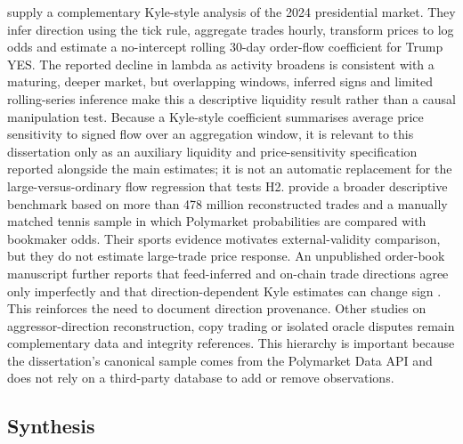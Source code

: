 \citet{tsangyang2026anatomy} supply a complementary Kyle-style analysis of the 2024 presidential market. They infer direction using the tick rule, aggregate trades hourly, transform prices to log odds and estimate a no-intercept rolling 30-day order-flow coefficient for Trump YES. The reported decline in lambda as activity broadens is consistent with a maturing, deeper market, but overlapping windows, inferred signs and limited rolling-series inference make this a descriptive liquidity result rather than a causal manipulation test. Because a Kyle-style coefficient summarises average price sensitivity to signed flow over an aggregation window, it is relevant to this dissertation only as an auxiliary liquidity and price-sensitivity specification reported alongside the main estimates; it is not an automatic replacement for the large-versus-ordinary flow regression that tests H2. \citet{reichenbach2026decentralized} provide a broader descriptive benchmark based on more than 478 million reconstructed trades and a manually matched tennis sample in which Polymarket probabilities are compared with bookmaker odds. Their sports evidence motivates external-validity comparison, but they do not estimate large-trade price response. An unpublished order-book manuscript further reports that feed-inferred and on-chain trade directions agree only imperfectly and that direction-dependent Kyle estimates can change sign \citep{dubach2026microstructure}. This reinforces the need to document direction provenance. Other studies on aggressor-direction reconstruction, copy trading or isolated oracle disputes remain complementary data and integrity references. This hierarchy is important because the dissertation's canonical sample comes from the Polymarket Data API and does not rely on a third-party database to add or remove observations.

\subsection{Synthesis}
\label{lr:synthesis}

